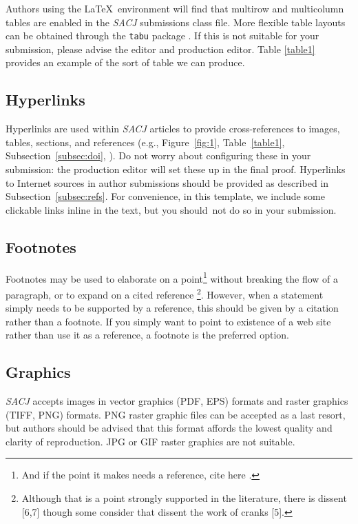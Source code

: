 \documentclass{article}
\begin{document}
Authors using the \LaTeX~environment will find that multirow and multicolumn tables are enabled in the {\em SACJ} submissions class file. More flexible table layouts can be obtained through the {\verb"tabu"} package \cite{chervetnd}. If this is not suitable for your submission, please advise the editor and production editor. Table \ref{table1} provides an example of the sort of table we can produce.

\subsection{Hyperlinks}
Hyperlinks are used within {\em SACJ} articles to provide cross-references to images, tables, sections, and references (e.g., Figure~\ref{fig:1}, Table~\ref{table1}, Subsection~\ref{subsec:doi}, \cite{kopka1995guide}). Do not worry about configuring these in your submission: the production editor will set these up in the final proof. Hyperlinks to Internet sources in author submissions should be provided as described in Subsection~\ref{subsec:refs}. For convenience, in this template, we include some clickable links inline in the text, but you should~not do so in your submission.  

\subsection{Footnotes}
Footnotes may be used to elaborate on a point\footnote{And if the point it makes needs a reference, cite here \cite{kopka1995guide}.} without breaking the flow of a paragraph, or to expand on a cited reference \cite{apa2013}\footnote{Although that is a point strongly supported in the literature, there is dissent [6,7] though some consider that dissent the work of cranks [5].}. However, when a statement simply needs to be supported by a reference, this should be given by a citation rather than a footnote. If you simply want to point to
existence of a web site rather than use it as a reference, a footnote is the preferred option.

\subsection{Graphics}
{\em SACJ} accepts images in vector graphics (PDF, EPS) formats and raster graphics (TIFF, PNG) formats. PNG raster graphic files can be accepted as a last resort, but authors should be advised that this format affords the lowest quality and clarity of reproduction. JPG or GIF raster graphics are not suitable.
\end{document}
